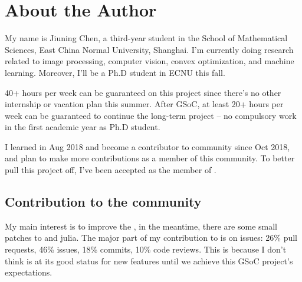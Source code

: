 
\section{About the Author}\label{sec:about_author}

My name is \textsf{Jiuning Chen}, a third-year student in the School of Mathematical Sciences, East China Normal University, Shanghai. I'm currently doing research related to image processing, computer vision, convex optimization, and machine learning. Moreover, I'll be a Ph.D student in ECNU this fall. \par

40+ hours per week can be guaranteed on this project since there's no other internship or vacation plan this summer. After GSoC, at least 20+ hours per week can be guaranteed to continue the long-term \images{}  project -- no compulsory work in the first academic year as Ph.D student. \par

I learned \langjulia in Aug 2018 and become a contributor to \langjulia community since Oct 2018, and plan to make more contributions as a member of this community. To better pull this project off, I've been accepted as the member of \juliaimages.

\subsection*{Contribution to the community}
My main interest is to improve the \images, in the meantime, there are some small patches to \flux{} and \textsf{julia}. The major part of my contribution to \textsf{\juliaimages} is on issues: 26\% pull requests, 46\% issues, 18\% commits, 10\% code reviews. This is because I don't think \images{} is at its good status for new features until we achieve this GSoC project's expectations.

